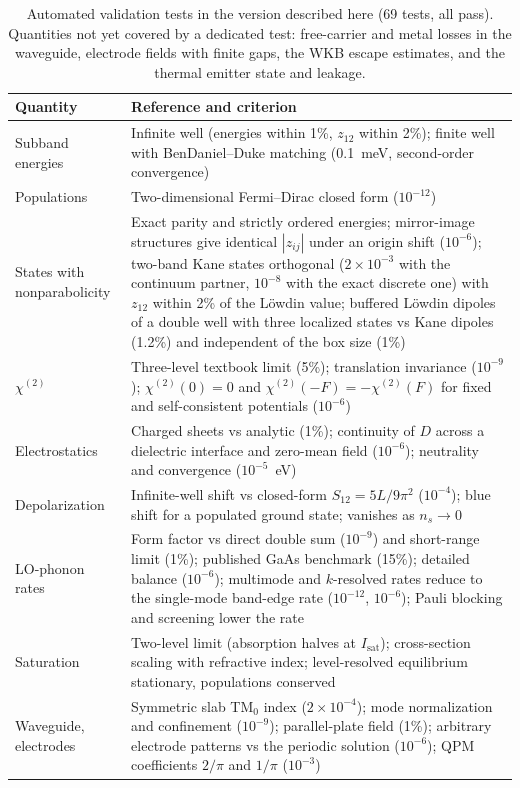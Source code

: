 \documentclass[11pt]{article}
\newcommand{\chitwo}{\chi^{(2)}}
\begin{document}
\begin{table}[tp]
\centering\footnotesize
\caption{Automated validation tests in the version described here (69 tests, all pass). Quantities not yet covered by a dedicated test: free-carrier and metal losses in the waveguide, electrode fields with finite gaps, the WKB escape estimates, and the thermal emitter state and leakage.}\label{tab:val}
\begin{tabularx}{\textwidth}{@{}lX@{}}
\toprule
Quantity & Reference and criterion \\ \midrule
Subband energies & Infinite well (energies within 1\%, $z_{12}$ within 2\%); finite well with BenDaniel--Duke matching (0.1~meV, second-order convergence) \\
Populations & Two-dimensional Fermi--Dirac closed form ($10^{-12}$) \\
States with nonparabolicity & Exact parity and strictly ordered energies; mirror-image structures give identical $|z_{ij}|$ under an origin shift ($10^{-6}$); two-band Kane states orthogonal ($2\times10^{-3}$ with the continuum partner, $10^{-8}$ with the exact discrete one) with $z_{12}$ within 2\% of the L\"owdin value; buffered L\"owdin dipoles of a double well with three localized states vs Kane dipoles (1.2\%) and independent of the box size (1\%) \\
$\chitwo$ & Three-level textbook limit \cite{Vurgaftman2021} (5\%); translation invariance ($10^{-9}$); $\chitwo(0)=0$ and $\chitwo(-F)=-\chitwo(F)$ for fixed and self-consistent potentials ($10^{-6}$) \\
Electrostatics & Charged sheets vs analytic (1\%); continuity of $D$ across a dielectric interface and zero-mean field ($10^{-6}$); neutrality and convergence ($10^{-5}$~eV) \\
Depolarization & Infinite-well shift vs closed-form $S_{12}=5L/9\pi^2$ ($10^{-4}$); blue shift for a populated ground state; vanishes as $n_s\to0$ \\
LO-phonon rates & Form factor vs direct double sum ($10^{-9}$) and short-range limit (1\%); published GaAs benchmark (15\%); detailed balance ($10^{-6}$); multimode and $k$-resolved rates reduce to the single-mode band-edge rate ($10^{-12}$, $10^{-6}$); Pauli blocking and screening lower the rate \\
Saturation & Two-level limit (absorption halves at $I_\mathrm{sat}$); cross-section scaling with refractive index; level-resolved equilibrium stationary, populations conserved \\
Waveguide, electrodes & Symmetric slab TM$_0$ index ($2\times10^{-4}$); mode normalization and confinement ($10^{-9}$); parallel-plate field (1\%); arbitrary electrode patterns vs the periodic solution ($10^{-6}$); QPM coefficients $2/\pi$ and $1/\pi$ ($10^{-3}$) \\

\end{tabularx}
\end{table}
\end{document}
